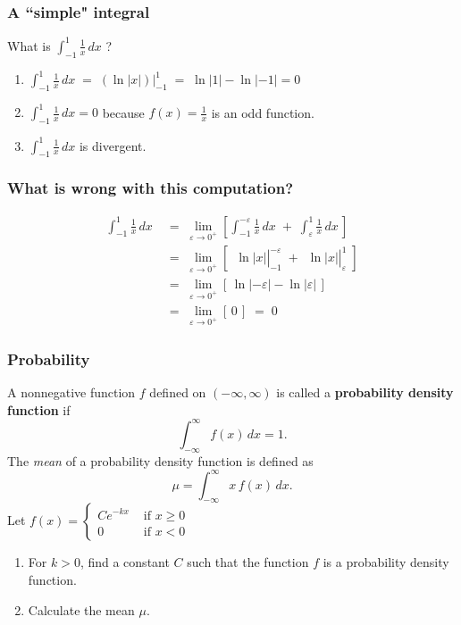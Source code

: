 \documentclass[14pt]{beamer}
\newcommand {\DS} [1] {${\displaystyle #1}$}
\newcommand{\e}{\varepsilon}
\newcommand{\p}{\pause}
\newcommand{\setsize}[1]{\fontsize{#1}{#1}\selectfont} %
\newcommand{\smallerfont}{\setsize{13}} %
\begin{document}
\begin{frame}[t]
\frametitle{A ``simple" integral}

What is \DS{\int_{-1}^{1} \frac{1}{x} \,  dx} \; ?
\p

\begin{enumerate}
\vfill
	\item \DS{\int_{-1}^{1} \frac{1}{x} \,  dx \; = \;  \left( \ln |x| \right) \Big\vert_{-1}^{1} \; = \;  \ln|1| - \ln|-1|  =  0}
\vfill
	\item \DS{\int_{-1}^{1} \frac{1}{x} \,  dx = 0} \; because  \DS{f(x) = \frac{1}{x}} is an odd function.
\vfill
	\item \DS{\int_{-1}^{1} \frac{1}{x} \,  dx} is divergent.
\vfill
\end{enumerate}

\end{frame}
\begin{frame}[t]
\frametitle{What is wrong with this computation?}

	$$
	\begin{aligned}
		\int_{-1}^{1} \frac{1}{x} \, dx \; &= \; \lim_{\e \to 0^+} \left[ \int_{-1}^{-\e} \frac{1}{x}\, dx \; + \; \int_{\e}^{1} \frac{1}{x} \, dx \, \right] 
			\\ \; &= \; \lim_{\e \to 0^+} \left[ \left.  \phantom{\frac 11} \ln|x| \right\vert_{-1}^{-\e}  \; +  \left. \phantom{\frac 11} \ln|x| \right\vert_{\e}^{1} \; \right] 
			\\ \; & = \; \lim_{\e \to 0^+}  \left[ \, \ln|-\e| - \ln |\e| \, \right] \phantom{\int}
			\\ \; &= \; \lim_{\e \to 0^+} \left[ \, 0 \, \right] \; = \; 0 \phantom{\int}
	\end{aligned}
	$$

\end{frame}
\begin{frame}[t]
\smallerfont
\frametitle{Probability}

\smallerfont
\vspace{-2mm}

A nonnegative function $f$ defined on $(-\infty,\infty)$ is called a {\bf probability density function } if
\vspace{-2mm}
	$$\int_{-\infty}^{\infty}f(x)\, dx=1.$$
The \emph{mean} of a probability density function is defined as
\vspace{-2mm}
	$$\mu=\int_{-\infty}^{\infty}x \, f(x)\, dx.$$
Let 
	\DS{f(x) = 
		\begin{cases}
			Ce^{-kx} & \mbox{ if } x\geq 0 \\
			0 & \mbox{ if } x <0
		\end{cases}
	}
\begin{enumerate}
	\item For $k>0$, find a constant $C$ such that the function $f$ is a probability density function.
	\item Calculate the mean $\mu$.
	
\end{enumerate}

\end{frame}
\end{document}

